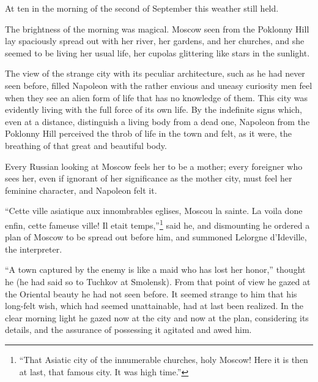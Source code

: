 At ten in the morning of the second of September this weather
still held.

The brightness of the morning was magical. Moscow seen from the
Poklonny Hill lay spaciously spread out with her river, her
gardens, and her churches, and she seemed to be living her usual
life, her cupolas glittering like stars in the sunlight.

The view of the strange city with its peculiar architecture, such
as he had never seen before, filled Napoleon with the rather
envious and uneasy curiosity men feel when they see an alien form
of life that has no knowledge of them. This city was evidently
living with the full force of its own life. By the indefinite
signs which, even at a distance, distinguish a living body from a
dead one, Napoleon from the Poklonny Hill perceived the throb of
life in the town and felt, as it were, the breathing of that
great and beautiful body.

Every Russian looking at Moscow feels her to be a mother; every
foreigner who sees her, even if ignorant of her significance as
the mother city, must feel her feminine character, and Napoleon
felt it.

``Cette ville asiatique aux innombrables eglises, Moscou la
sainte. La voila done enfin, cette fameuse ville! Il etait
temps,''\footnote{``That Asiatic city of the innumerable
churches, holy Moscow! Here it is then at last, that famous
city. It was high time.''} said he, and dismounting he ordered a
plan of Moscow to be spread out before him, and summoned Lelorgne
d'Ideville, the interpreter.

``A town captured by the enemy is like a maid who has lost her
honor,'' thought he (he had said so to Tuchkov at Smolensk). From
that point of view he gazed at the Oriental beauty he had not
seen before. It seemed strange to him that his long-felt wish,
which had seemed unattainable, had at last been realized. In the
clear morning light he gazed now at the city and now at the plan,
considering its details, and the assurance of possessing it
agitated and awed him.

